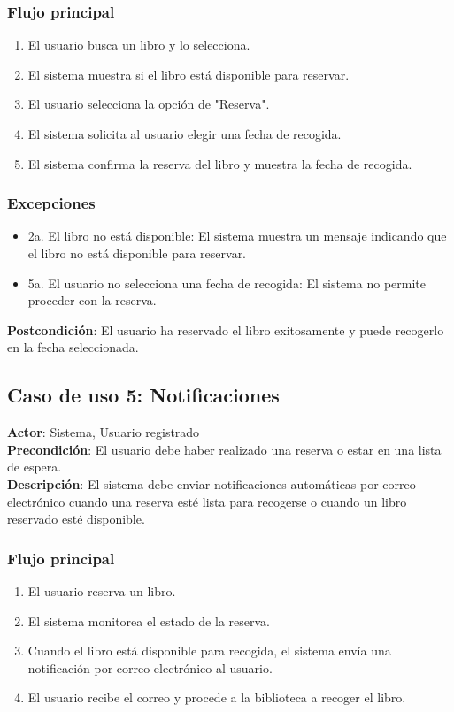 \documentclass{scrreprt}
\begin{document}
\subsubsection{Flujo principal}
\begin{enumerate}
    \item El usuario busca un libro y lo selecciona.
    \item El sistema muestra si el libro está disponible para reservar.
    \item El usuario selecciona la opción de "Reserva".
    \item El sistema solicita al usuario elegir una fecha de recogida.
    \item El sistema confirma la reserva del libro y muestra la fecha de recogida.
\end{enumerate}

\subsubsection{Excepciones}
\begin{itemize}
    \item 2a. El libro no está disponible: El sistema muestra un mensaje indicando que el libro no está disponible para reservar.
    \item 5a. El usuario no selecciona una fecha de recogida: El sistema no permite proceder con la reserva.
\end{itemize}

\textbf{Postcondición}: El usuario ha reservado el libro exitosamente y puede recogerlo en la fecha seleccionada.

\subsection{Caso de uso 5: Notificaciones}
\textbf{Actor}: Sistema, Usuario registrado \\
\textbf{Precondición}: El usuario debe haber realizado una reserva o estar en una lista de espera. \\
\textbf{Descripción}: El sistema debe enviar notificaciones automáticas por correo electrónico cuando una reserva esté lista para recogerse o cuando un libro reservado esté disponible.

\subsubsection{Flujo principal}
\begin{enumerate}
    \item El usuario reserva un libro.
    \item El sistema monitorea el estado de la reserva.
    \item Cuando el libro está disponible para recogida, el sistema envía una notificación por correo electrónico al usuario.
    \item El usuario recibe el correo y procede a la biblioteca a recoger el libro.
\end{enumerate}
\end{document}
